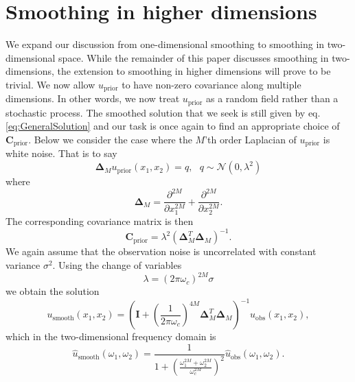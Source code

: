 \documentclass[10pt,a4paper]{article}
\begin{document}
\section*{Smoothing in higher dimensions} 
We expand our discussion from one-dimensional smoothing to smoothing in two-dimensional space.  While the remainder of this paper discusses smoothing in two-dimensions, the extension to smoothing in higher dimensions will prove to be trivial.  We now allow $u_\mathrm{prior}$ to have non-zero covariance along multiple dimensions.  In other words, we now treat $u_\mathrm{prior}$ as a random field rather than a stochastic process.  The smoothed solution that we seek is still given by eq. \ref{eq:GeneralSolution} and our task is once again to find an appropriate choice of $\mathbf{C}_\mathrm{prior}$.  Below we consider the case where the $M$'th order Laplacian of $u_\mathrm{prior}$ is white noise.  That is to say
\begin{equation}
  \mathbf{\Delta}_M u_\mathrm{prior}(x_1,x_2) = q, \ \ \ q \sim \mathcal{N}(0,\lambda^2)
\end{equation}  
where 
\begin{equation}\label{Laplacian}
\mathbf{\Delta}_M = \frac{\partial^{2M}}{\partial x_1^{2M}} +
           \frac{\partial^{2M}}{\partial x_2^{2M}}.
\end{equation} 
The corresponding covariance matrix is then
\begin{equation}\label{Covariance2D}
\mathbf{C}_\mathrm{prior} = \lambda^2\left(\mathbf{\Delta}_M^T\mathbf{\Delta}_M\right)^{-1}. 
\end{equation}           
We again assume that the observation noise is uncorrelated with constant variance $\sigma^2$.  Using the change of variables
\begin{equation}
\lambda = (2\pi\omega_c)^{2M}\sigma
\end{equation}
we obtain the solution
\begin{equation}\label{eq:TimeSoln2d}
u_\mathrm{smooth}(x_1,x_2) = \left(\mathbf{I} + 
                          \left(\frac{1}{2\pi\omega_c}\right)^{4M}
                          \mathbf{\Delta}_M^T\mathbf{\Delta}_M\right)^{-1}
                          u_\mathrm{obs}(x_1,x_2),
\end{equation}
which in the two-dimensional frequency domain is
\begin{equation}\label{eq:FourierSoln2d}
\hat{u}_\mathrm{smooth}(\omega_1,\omega_2) = \frac{1}{1 + \left(\frac{\omega_1^{2M} + \omega_2^{2M}}
                                                  {\omega_c^{2M}}\right)^2}
                                             \hat{u}_\mathrm{obs}(\omega_1,\omega_2).
\end{equation}
\end{document}
